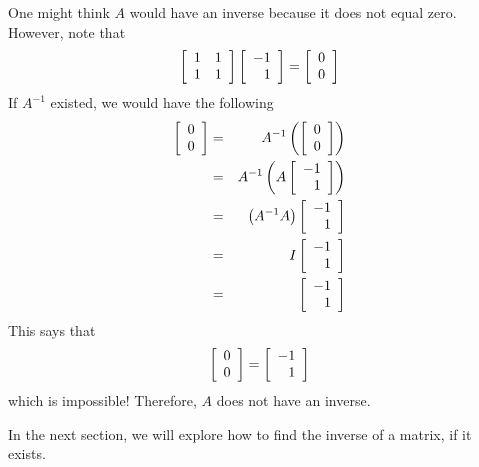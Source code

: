 \begin{solution} One might think $A$ would have an inverse because it does not equal zero.
However, note that 
\begin{equation*}
\left[
\begin{array}{rr}
1 & 1 \\
1 & 1
\end{array}
\right] \left[
\begin{array}{r}
-1 \\
1
\end{array}
\right] =\left[
\begin{array}{r}
0 \\
0
\end{array}
\right]
\end{equation*}
If $A^{-1}$ existed, we would have the following
\begin{eqnarray*}
\left[
\begin{array}{r}
0 \\
0
\end{array}
\right] &=& A^{-1}\left( \left[
\begin{array}{r}
0 \\
0
\end{array}
\right] \right) \\
&=& A^{-1}\left( A\left[
\begin{array}{r}
-1 \\
1
\end{array}
\right] \right) \\
&=&\left( A^{-1}A\right) \left[
\begin{array}{r}
-1 \\
1
\end{array}
\right] \\
&=&I\left[
\begin{array}{r}
-1 \\
1
\end{array}
\right] \\
&=&\left[
\begin{array}{r}
-1 \\
1
\end{array}
\right]
\end{eqnarray*}
This says that 
\begin{equation*}
\left[
\begin{array}{r}
0 \\
0
\end{array}
\right]
=
\left[
\begin{array}{r}
-1 \\
1
\end{array}
\right]
\end{equation*}
which is impossible! Therefore, $A$ does not have an inverse. 
\end{solution}

In the next section, we will explore how to find the inverse of a matrix, if it exists. 